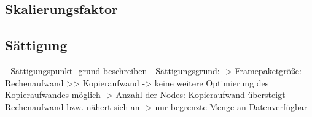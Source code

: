 \subsection{Skalierungsfaktor}


\subsection{Sättigung}

\begin{correctmore}
	- Sättigungspunkt -grund beschreiben
	- Sättigungsgrund:
	-> Framepaketgröße: Rechenaufwand >> Kopieraufwand -> keine weitere Optimierung des Kopieraufwandes möglich
	-> Anzahl der Nodes: Kopieraufwand übersteigt Rechenaufwand bzw. nähert sich an
	-> nur begrenzte Menge an Datenverfügbar
\end{correctmore}